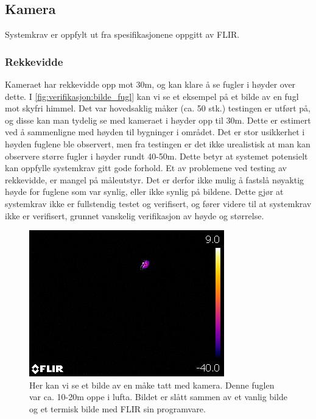 \subsection{Kamera}\label{sec:verifikasjon:kamera}

Systemkrav  er oppfylt ut fra spesifikasjonene oppgitt av FLIR. 

\subsubsection{Rekkevidde}\label{sec:verifikasjon:rekkevidde}
Kameraet har rekkevidde opp mot 30m, og kan klare å se fugler i høyder over dette. 
I \autoref{fig:verifikasjon:bilde_fugl} kan vi se et eksempel på et bilde av en fugl mot skyfri himmel. 
Det var hovedsaklig måker (ca. 50 stk.) testingen er utført på, og disse kan man tydelig se med kameraet i høyder opp til 30m. 
Dette er estimert ved å sammenligne med høyden til bygninger i området. 
Det er stor usikkerhet i høyden fuglene ble observert, men fra testingen er det ikke urealistisk at man kan observere større fugler i høyder rundt 40-50m. 
Dette betyr at systemet potensielt kan oppfylle systemkrav  gitt gode forhold.
Et av problemene ved testing av rekkevidde, er mangel på måleutstyr. 
Det er derfor ikke mulig å fastslå nøyaktig høyde for fuglene som var synlig, eller ikke synlig på bildene.
Dette gjør at systemkrav  ikke er fullstendig testet og verifisert, og fører videre til at systemkrav  ikke er verifisert, grunnet vanskelig verifikasjon av høyde og størrelse.

\begin{figure}[H]
    \centering
    \includegraphics[width=.5\textwidth]{verifikasjon-test/Kamera/FLIR0059.jpg}
    \caption{Her kan vi se et bilde av en måke tatt med kamera. Denne fuglen var ca. 10-20m oppe i lufta. Bildet er slått sammen av et vanlig bilde og et termisk bilde med FLIR sin programvare.}
    \label{fig:verifikasjon:bilde_fugl}
\end{figure}

